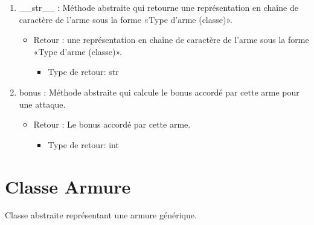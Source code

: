 \documentclass[12pt,pdftex,oneside]{article}
\begin{document}
\begin{itemize}
    \begin{enumerate}
    \item \_\_str\_\_ : Méthode abstraite qui retourne une représentation en chaîne de caractère de l'arme
      sous la forme «Type d'arme (classe)».
      \begin{itemize}
      \item Retour :  une représentation en chaîne de caractère de l'arme
      sous la forme «Type d'arme (classe)».
          \begin{itemize}
          \item Type de retour: str
          \end{itemize}
      \end{itemize}
    \item bonus : Méthode abstraite qui calcule le bonus accordé par cette arme
      pour une attaque.
      \begin{itemize}
      \item Retour : Le bonus accordé par cette arme.
          \begin{itemize}
          \item Type de retour: int
          \end{itemize}
      \end{itemize}

    \end{enumerate}
  \end{itemize}

  \section {Classe Armure}

  Classe abstraite représentant une armure générique.
\end{document}
